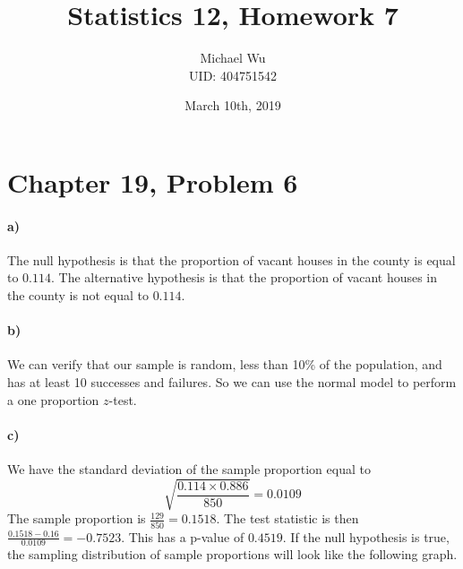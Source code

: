 \documentclass[12pt]{article}
\begin{document}
\title{Statistics 12, Homework 7}
\date{March 10th, 2019}
\author{Michael Wu\\UID: 404751542}
\maketitle

\section*{Chapter 19, Problem 6}

\paragraph{a)}

The null hypothesis is that the proportion of vacant houses in the county is equal to \(0.114\). The alternative
hypothesis is that the proportion of vacant houses in the county is not equal to \(0.114\).

\paragraph{b)}

We can verify that our sample is random, less than 10\% of the population, and has at least 10 successes and failures. So
we can use the normal model to perform a one proportion \(z\)-test.

\paragraph{c)}

We have the standard deviation of the sample proportion equal to
\[\sqrt{\frac{0.114\times0.886}{850}}=0.0109\]
The sample proportion is \(\frac{129}{850}=0.1518\). The test statistic is then \(\frac{0.1518-0.16}{0.0109}=-0.7523\).
This has a p-value of \(0.4519\). If the null hypothesis is true, the sampling distribution of sample proportions will
look like the following graph.
\begin{center}
\end{center}
\end{document}
